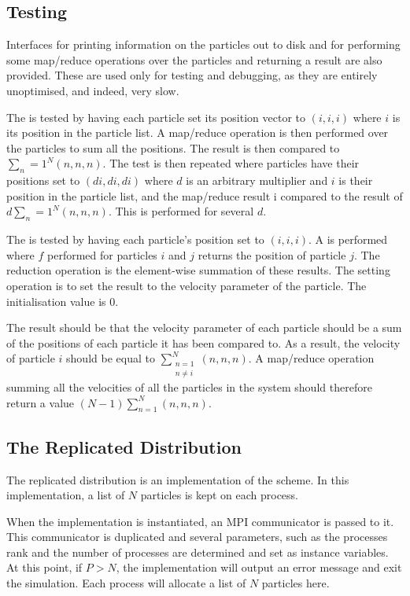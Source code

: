 \subsection{Testing}

Interfaces for printing information on the particles
out to disk and for performing some map/reduce operations over
the particles and returning a result are also provided.
%
These are used only for testing and debugging, as they are entirely
unoptimised, and indeed, very slow.

The \individualoperation{} is tested by having each particle set
its position vector to $(i, i, i)$ where $i$ is its position in the
particle list.
%
A map/reduce operation is then performed over the particles to
sum all the positions.
%
The result is then compared to $\sum_n=1^N (n, n, n)$.
%
The test is then repeated where particles have their positions set to
$(di, di, di)$ where $d$ is an arbitrary multiplier and $i$ is their
position in the particle list, and the map/reduce result i
compared to the result of $d\sum_n=1^N (n, n, n)$.
%
This is performed for several $d$.

The \pairoperation{} is tested by having each particle's position set
to $(i, i, i)$.
%
A \pairoperation{} is performed where $f$ performed for particles $i$ and
$j$ returns the position of particle $j$.
%
The reduction operation is the element-wise summation of these results.
%
The setting operation is to set the result to the velocity parameter of
the particle.
%
The initialisation value is 0.

The result should be that the velocity parameter of each particle should
be a sum of the positions of each particle it has been compared to.
%
As a result, the velocity of particle $i$ should be equal to
$\sum_{\substack{n=1\\n\ne{}i}}^N (n, n, n)$.
%
A map/reduce operation summing all the velocities of all the particles
in the system should therefore return a value
$(N-1)\sum_{n=1}^N (n, n, n)$.


\subsection{The Replicated Distribution}

%
The replicated distribution is an implementation of the \replicateddata{}
scheme.
%
In this implementation, a list of $N$ particles is kept on each process.

When the implementation is instantiated, an MPI communicator is passed to it.
%
This communicator is duplicated and several parameters, such as
the processes rank and the number of processes are determined and
set as instance variables.
%
At this point, if $P > N$, the implementation will output an error message
and exit the simulation.
%
Each process will allocate a list of $N$ particles here.

